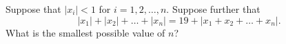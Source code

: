 Suppose that $|x_i| < 1$ for $i = 1, 2, \dots, n$.  Suppose further that
\[ |x_1| + |x_2| + \dots + |x_n| = 19 + |x_1 + x_2 + \dots + x_n|. \]
What is the smallest possible value of $n$?